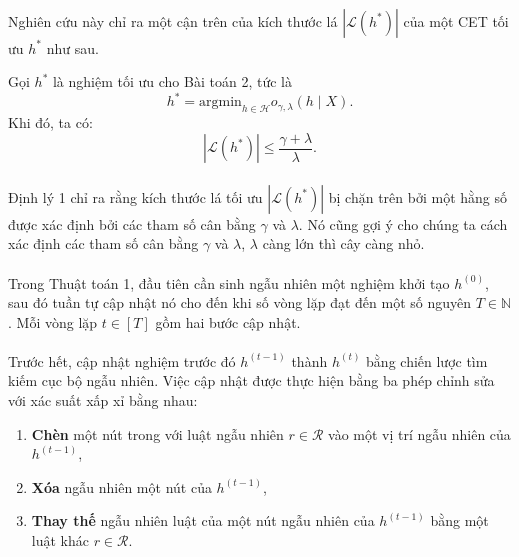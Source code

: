 \paragraph{} Nghiên cứu này chỉ ra một cận trên của kích thước lá \(|\mathcal{L}(h^*)|\) của một CET tối ưu \(h^*\) như sau.

\renewcommand\thetheorem{1}
\begin{theorem}
Gọi $h^*$ là nghiệm tối ưu cho Bài toán 2, tức là
\[
h^* = \text{argmin}_{h \in \mathcal{H}} o_{\gamma, \lambda}(h \mid X).
\]
Khi đó, ta có:
\[
|\mathcal{L}(h^*)| \leq \frac{\gamma + \lambda}{\lambda}.
\]
\end{theorem}

\paragraph{} Định lý 1 chỉ ra rằng kích thước lá tối ưu $|\mathcal{L}(h^*)|$ bị chặn trên bởi một hằng số được xác định bởi các tham số cân bằng $\gamma$ và $\lambda$. Nó cũng gợi ý cho chúng ta cách xác định các tham số cân bằng $\gamma$ và $\lambda$, $\lambda$ càng lớn thì cây càng nhỏ.


\paragraph{} Trong Thuật toán 1, đầu tiên cần sinh ngẫu nhiên một nghiệm khởi tạo \(h^{(0)}\), sau đó tuần tự cập nhật nó cho đến khi số vòng lặp đạt đến một số nguyên \(T \in \mathbb{N}\). Mỗi vòng lặp \(t \in [T]\) gồm hai bước cập nhật.

\paragraph{} Trước hết, cập nhật nghiệm trước đó \(h^{(t-1)}\) thành \(h^{(t)}\) bằng chiến lược tìm kiếm cục bộ ngẫu nhiên. Việc cập nhật được thực hiện bằng ba phép chỉnh sửa với xác suất xấp xỉ bằng nhau:

\begin{enumerate}
  \item \textbf{Chèn} một nút trong với luật ngẫu nhiên \(r \in \mathcal{R}\) vào một vị trí ngẫu nhiên của \(h^{(t-1)}\),  
  \item \textbf{Xóa} ngẫu nhiên một nút của \(h^{(t-1)}\),  
  \item \textbf{Thay thế} ngẫu nhiên luật của một nút ngẫu nhiên của \(h^{(t-1)}\) bằng một luật khác \(r \in \mathcal{R}\).  
\end{enumerate}

